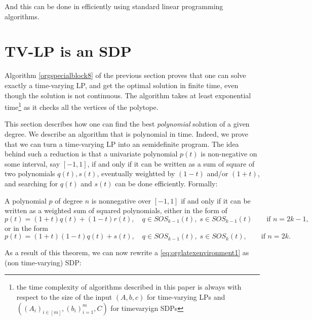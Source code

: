\documentclass[moor]{informs1}
\begin{document}
And this can be done in efficiently using standard linear programming algorithms.
\newpage




\section{TV-LP is an SDP}
\label{sec:orgheadline16}
\label{orgtarget1}

Algorithm \ref{orgspecialblock8} of the previous section proves that one can solve exactly a time-varying LP, and get the optimal solution in finite time, even though the solution is not continuous. The algorithm takes at least exponential time\footnote{the time complexity of algorithms described in this paper is always with respect to the size of the input \((A, b, c)\) for time-varying LPs and \(((A_i)_{i\in[m]}, (b_i)_{i=1}^m, C)\) for timevaryign SDPs} as it checks all the vertices of the polytope.

This section describes how one can find the best \emph{polynomial} solution of a given degree. We describe an algorithm that is polynomial in time. Indeed, we prove that we can turn a time-varying LP into an semidefinite program. The idea behind such a reduction is that a univariate polynomial \(p(t)\) is non-negative on some interval, say \([-1, 1]\), if and only if it can be written as a sum of square of two polynomials \(q(t), s(t)\), eventually weightted by \((1-t)\) and/or \((1+t)\), and searching for \(q(t)\) and \(s(t)\) can be done efficiently. Formally:


\begin{thm}
A polynomial \(p\) of degree \(n\) is nonnegative over \([-1,1]\) if and only if it can be written as a weighted sum of squared polynomials, either in the form of
\begin{equation}
p(t)=(1+t)q(t)+(1-t)r(t), \quad q\in SOS_{k-1}(t),\; s\in SOS_{k-1}(t) \qquad \text{if }n=2k-1,\label{eq:wsos-odd}
\end{equation}
or in the form
\begin{equation}
p(t)=(1+t)(1-t)q(t)+s(t), \quad q\in SOS_{k-1}(t),\; s\in SOS_k(t), \qquad \text{if }n=2k.\phantom{-1 }\label{eq:wsos-even}
\end{equation}
\end{thm}

As a result of this theorem, we can now rewrite a \ref{eq:orglatexenvironment1} as (non time-varying) SDP:
\end{document}
